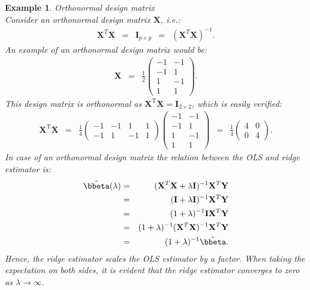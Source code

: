 \documentclass[a4paper]{article}
\theoremstyle{myexamplestyle}
\newtheorem{example}{Example}
\begin{document}
\begin{example} \textit{Orthonormal design matrix}
\\
Consider an orthonormal design matrix $\mathbf{X}$, i.e.:
\begin{eqnarray*}
\mathbf{X}^T \mathbf{X} & = & \mathbf{I}_{p \times p} \, \, \, = \, \, \, (\mathbf{X}^T \mathbf{X})^{-1}.
\end{eqnarray*}
An example of an orthonormal design matrix would be:
\begin{eqnarray*}
\mathbf{X} & = & \frac{1}{2} \left(
\begin{array}{rr}
-1 & -1
\\
-1 & 1
\\
1 & -1
\\
1 & 1
\end{array} \right).
\end{eqnarray*}
This design matrix is orthonormal as $\mathbf{X}^{\mathrm{T}} \mathbf{X} = \mathbf{I}_{2 \times 2}$, which is easily verified:
\begin{eqnarray*}
\mathbf{X}^{\mathrm{T}} \mathbf{X} & = & \frac{1}{4} 
\left(
\begin{array}{rrrr}
-1 & -1 & 1 & 1 
\\
-1 & 1 & -1 & 1 
\end{array} \right)
\left(
\begin{array}{rr}
-1 & -1
\\
-1 & 1
\\
1 & -1
\\
1 & 1
\end{array} \right) \, \, \, = \, \, \, 
\frac{1}{4} 
\left(
\begin{array}{rr}
4 & 0
\\
0 & 4 
\end{array} \right).
\end{eqnarray*}
In case of an orthonormal design matrix the relation between the OLS and ridge estimator is:
\begin{eqnarray*}
\hat{\bbeta}(\lambda) & = & (\mathbf{X}^T \mathbf{X} + \lambda \mathbf{I})^{-1} \mathbf{X}^T \mathbf{Y}
\\
& = & (\mathbf{I} + \lambda \mathbf{I})^{-1} \mathbf{X}^T \mathbf{Y}
\\
& = & (1 + \lambda)^{-1} \mathbf{I} \mathbf{X}^T \mathbf{Y}
\\
& = & (1 + \lambda)^{-1} (\mathbf{X}^T \mathbf{X})^{-1} \mathbf{X}^T \mathbf{Y}
\\
& = & (1 + \lambda)^{-1} \hat{\bbeta}.
\end{eqnarray*}
Hence, the ridge estimator scales the OLS estimator by a factor. When taking the expectation on both sides, it is evident that the ridge estimator converges to zero as $\lambda \rightarrow \infty$. 
\end{example}
\end{document}
